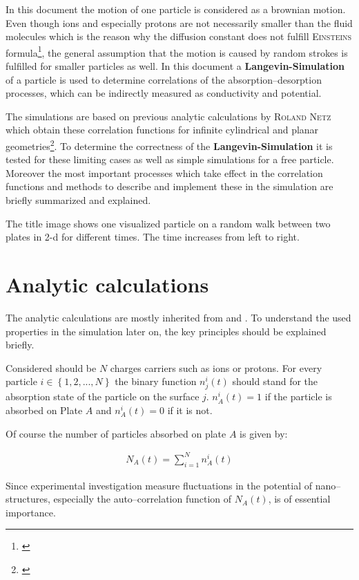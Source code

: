 \documentclass[a4paper, parskip=half]{scrartcl}
\newcommand{\person}[1]{%
	\textsc{#1}%
}
\newcommand{\effect}[1]{%
	\textbf{#1}%
}
\newcommand{\myCite}[1]{\footnote{\cite{#1} \citeauthor{#1} \citetitle{#1} \citeyear{#1}}}
\begin{document}
In this document the motion of one particle is considered as a brownian motion. Even though ions and especially protons are not necessarily smaller than the fluid molecules which is the reason why the diffusion constant does not fulfill \person{Einsteins} formula\myCite{brownian}, the general assumption that the motion is caused by random strokes is fulfilled for smaller particles as well. In this document a \effect{Langevin-Simulation} of a particle is used to determine correlations of the absorption--desorption processes, which can be indirectly measured as conductivity and potential.

The simulations are based on previous analytic calculations by \person{Roland Netz} which obtain these correlation functions for infinite cylindrical and planar geometries\myCite{netzpaper}. To determine the correctness of the \effect{Langevin-Simulation} it is tested for these limiting cases as well as simple simulations for a free particle. Moreover the most important processes which take effect in the correlation functions and methods to describe and implement these in the simulation are briefly summarized and explained.

The title image shows one visualized particle on a random walk between two plates in 2-d for different times. The time increases from left to right. 

\newpage
\section{Analytic calculations}
The analytic calculations are mostly inherited from \cite{netzpaper} and \cite{netzpaper2}. To understand the used properties in the simulation later on, the key principles should be explained briefly.

Considered should be $N$ charges carriers such as ions or protons. For every particle $i\in\left\lbrace 1,2,...,N \right\rbrace$ the binary function $n_j^i(t)$ should stand for the absorption state of the particle on the surface $j$. $n_A^i(t) = 1$ if the particle is absorbed on Plate $A$ and $n_A^i(t) = 0$ if it is not.

Of course the number of particles absorbed on plate $A$ is given by:

\begin{align}
N_A(t) = \sum_{i=1}^N n_A^i(t)
\end{align}

Since experimental investigation measure fluctuations in the potential of nano--structures, especially the auto--correlation function of $N_A(t)$, is of essential importance.
\end{document}
